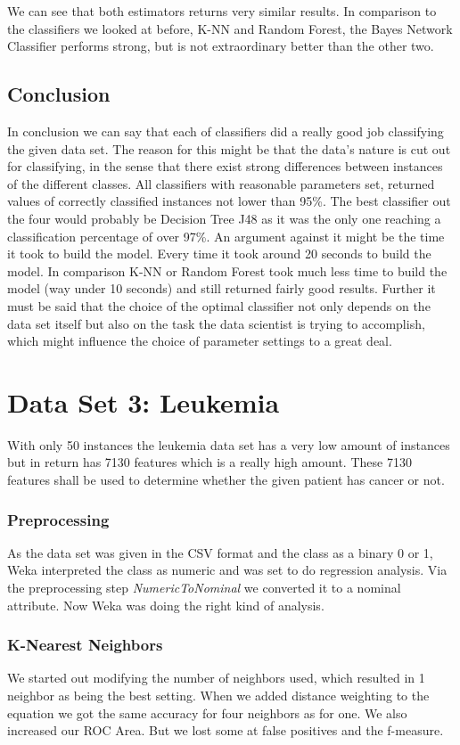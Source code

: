 \documentclass{sig-alternate-05-2015}
\begin{document}
{We can see that both estimators returns very similar results. In comparison to the classifiers we looked at before, K-NN and Random Forest, the Bayes Network Classifier performs strong, but is not extraordinary better than the other two. 

\subsection{Conclusion}
In conclusion we can say that each of classifiers did a really good job classifying the given data set. The reason for this might be that the data's nature is cut out for classifying, in the sense that there exist strong differences between instances of the different classes. All classifiers with reasonable parameters set, returned values of correctly classified instances not lower than 95\%. The best classifier out the four would probably be Decision Tree J48 as it was the only one reaching a classification percentage of over 97\%. An argument against it might be the time it took to build the model. Every time it took around 20 seconds to build the model. In comparison K-NN or Random Forest took much less time to build the model (way under 10 seconds) and still returned fairly good results. Further it must be said that the choice of the optimal classifier not only depends on the data set itself but also on the task the data scientist is trying to accomplish, which might influence the choice of parameter settings to a great deal.   

\section{Data Set 3: Leukemia}
With only 50 instances the leukemia data set has a very low amount of instances but in return has 7130 features which is a really high amount. These 7130 features shall be used to determine whether the given patient has cancer or not.  \\
\subsubsection{Preprocessing}
As the data set was given in the CSV format and the class as a binary 0 or 1, Weka interpreted the class as numeric and was set to do regression analysis. Via the preprocessing step \emph{NumericToNominal} we converted it to a nominal attribute. Now Weka was doing the right kind of analysis.
\subsubsection{K-Nearest Neighbors}
We started out modifying the number of neighbors used, which resulted in 1 neighbor as being the best setting. When we added distance weighting to the equation we got the same accuracy for four neighbors as for one. We also increased our ROC Area.  But we lost some at false positives and the f-measure. \\

}
\end{document}
